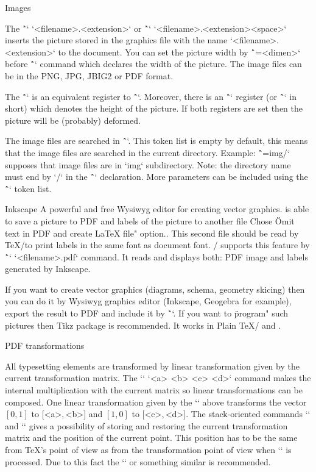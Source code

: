 {\secc Images

The \^`\inspic` `{<filename>.<extension>}` or
\^`\inspic` `<filename>.<extension><space>`
inserts the picture stored in
the graphics file with the name `<filename>.<extension>` to the document.
You can set the picture width by \^`\picw=<dimen>`
before \^`\inspic` command which declares the width of the picture.
The image files can be in the PNG, JPG, JBIG2 or PDF format.

The \^`\picwidth` is an equivalent register to \^`\picw`. Moreover, there is an
\^`\picheight` register (or \^`\pich` in short)
which denotes the height of the picture. If both
registers are set then the picture will be (probably) deformed.

The image files are searched in \^`\picdir`. This token list is empty
by default, this means that the image files are searched in the
current directory. Example: \^`\picdir={img/}` supposes that image files are
in `img` subdirectory. Note: the directory name must end by `/` in
the \^`\picdir` declaration.
More parameters can be included using the \^`\picparams` token list.

Inkscape\fnote
{A powerful and free Wysiwyg editor for creating vector graphics.}
is able to save a picture to PDF and labels of the picture to another
file\fnote
{Chose \"Omit text in PDF and create LaTeX file" option.}.
This second file should be read by \TeX/to print labels
in the same font as document font. \OpTeX/ supports this feature by
\^`\inkinspic` `{<filename>.pdf}` command. It reads and displays
both: PDF image and labels generated by Inkscape.

If you want to create vector graphics (diagrams, schema, geometry
skicing) then you can do it by Wysiwyg graphics editor (Inkscape, Geogebra for
example), export the result to PDF and include it by \^`\inspic`.
If you want to \"program" such pictures then Tikz package is recommended.
It works in Plain \TeX/ and \OpTeX.

\secc PDF transformations

All typesetting elements are transformed by linear
transformation given by the current transformation matrix. The
`\pdfsetmatrix` `{<a> <b> <c> <d>}` command makes the internal multiplication
with the current matrix so linear transformations can be composed.
One linear transformation given by the `\pdfsetmatrix` above transforms
the vector $[0,1]$ to [<a>,\,<b>] and $[1,0]$ to [<c>,\,<d>].
The stack-oriented commands `\pdfsave` and `\pdfrestore` gives a possibility of
storing and restoring the current transformation matrix and the position of the current point.
This position has to be the same from \TeX{}'s point of
view as from the transformation point of view when `\pdfrestore` is processed.
Due to this fact the `\pdfsave{}\pdfrestore`
or something similar is recommended.

}
